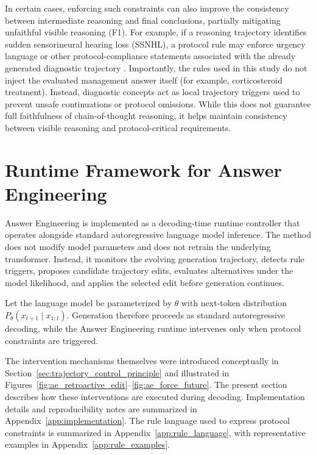 \documentclass[twocolumn]{article}
\begin{document}
In certain cases, enforcing such constraints can also improve the consistency
between intermediate reasoning and final conclusions, partially mitigating
unfaithful visible reasoning (F1). For example, if a reasoning trajectory
identifies sudden sensorineural hearing loss (SSNHL), a protocol rule may
enforce urgency language or other protocol-compliance statements associated with
the already generated diagnostic trajectory \textcite{chandrasekhar2019ssnhl}.
Importantly, the rules used in this study do not inject the evaluated management
answer itself (for example, corticosteroid treatment). Instead, diagnostic
concepts act as local trajectory triggers used to prevent unsafe continuations
or protocol omissions. While this does not guarantee full faithfulness of
chain-of-thought reasoning, it helps maintain consistency between visible
reasoning and protocol-critical requirements.

\section{Runtime Framework for Answer Engineering}

Answer Engineering is implemented as a decoding-time runtime controller that
operates alongside standard autoregressive language model inference. The method
does not modify model parameters and does not retrain the underlying
transformer. Instead, it monitors the evolving generation trajectory, detects
rule triggers, proposes candidate trajectory edits, evaluates alternatives under
the model likelihood, and applies the selected edit before generation continues.

Let the language model be parameterized by $\theta$ with next-token distribution
$P_\theta(x_{t+1}\mid x_{1:t})$. Generation therefore proceeds as standard
autoregressive decoding, while the Answer Engineering runtime intervenes only
when protocol constraints are triggered.

The intervention mechanisms themselves were introduced conceptually in
Section~\ref{sec:trajectory_control_principle} and illustrated in
Figures~\ref{fig:ae_retroactive_edit}--\ref{fig:ae_force_future}. The present
section describes how these interventions are executed during decoding.
Implementation details and reproducibility notes are summarized in
Appendix~\ref{app:implementation}. The rule language used to express protocol
constraints is summarized in Appendix~\ref{app:rule_language}, with
representative examples in Appendix~\ref{app:rule_examples}.
\end{document}
